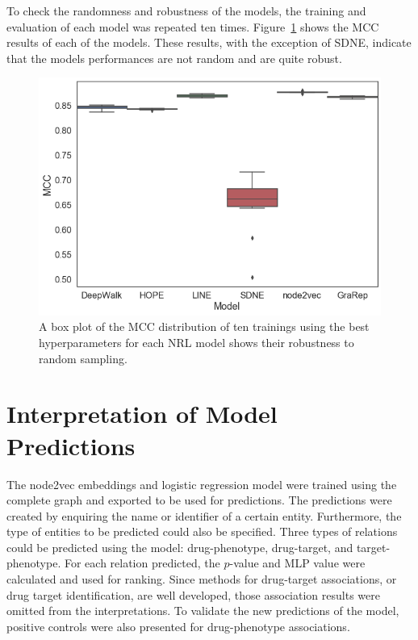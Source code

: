 To check the randomness and robustness of the models, the training and evaluation of each model was repeated ten times.
Figure~\ref{fig:boxplot} shows the \ac{MCC} results of each of the models.
These results, with the exception of SDNE, indicate that the models performances are not random and are quite robust.

\begin{figure}[h!]
    \centering
    \includegraphics[scale=0.4]
    {figures/boxplot.png}
    \caption[A box plot of the robustness of the evaluated network representation learning models]{\label{fig:boxplot} A box plot of the \ac{MCC} distribution of ten trainings using the best hyperparameters for each \ac{NRL} model shows their robustness to random sampling.}
\end{figure}

\section{Interpretation of Model Predictions}

The node2vec embeddings and logistic regression model were trained using the complete graph and exported to be used for predictions.
The predictions were created by enquiring the name or identifier of a certain entity.
Furthermore, the type of entities to be predicted could also be specified.
Three types of relations could be predicted using the model: drug-phenotype, drug-target, and target-phenotype.
For each relation predicted, the $p$-value and \ac{MLP} value were calculated and used for ranking.
Since methods for drug-target associations, or drug target identification, are well developed, those association results were omitted from the interpretations.
To validate the new predictions of the model, positive controls were also presented for drug-phenotype associations.


